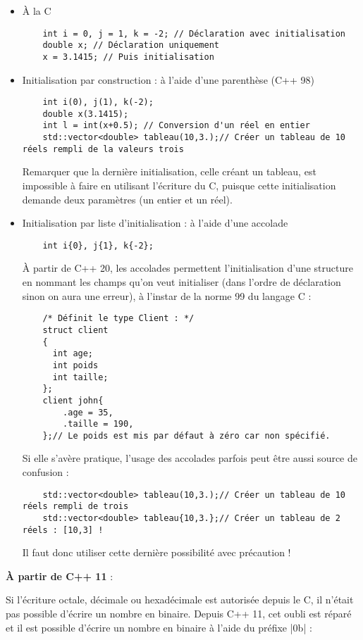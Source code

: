 \begin{itemize}
    \item À la C
    \begin{lstlisting}
    int i = 0, j = 1, k = -2; // Déclaration avec initialisation
    double x; // Déclaration uniquement
    x = 3.1415; // Puis initialisation
    \end{lstlisting}
    \item Initialisation par construction : à l'aide d'une parenthèse (C++ 98)
    \begin{lstlisting}
    int i(0), j(1), k(-2);
    double x(3.1415);
    int l = int(x+0.5); // Conversion d'un réel en entier
    std::vector<double> tableau(10,3.);// Créer un tableau de 10 réels rempli de la valeurs trois
    \end{lstlisting}
    Remarquer que la dernière initialisation, celle créant un tableau, est impossible à
    faire en utilisant l'écriture du C, puisque cette initialisation demande deux paramètres
    (un entier et un réel).
    \item Initialisation par liste d'initialisation : à l'aide d'une accolade
    \begin{lstlisting}
    int i{0}, j{1}, k{-2};
    \end{lstlisting}
    À partir de C++ 20, les accolades permettent l'initialisation d'une structure en nommant les champs qu'on veut initialiser
    (dans l'ordre de déclaration sinon on aura une erreur), à l'instar de la norme 99 du langage C :
    \begin{lstlisting}
    /* Définit le type Client : */
    struct client
    {
      int age;
      int poids
      int taille;
    };
    client john{
        .age = 35,
        .taille = 190,
    };// Le poids est mis par défaut à zéro car non spécifié.
    \end{lstlisting}
    Si elle s'avère pratique, l'usage des accolades parfois peut être aussi source de confusion :
    \begin{lstlisting}
    std::vector<double> tableau(10,3.);// Créer un tableau de 10 réels rempli de trois
    std::vector<double> tableau{10,3.};// Créer un tableau de 2 réels : [10,3] !
    \end{lstlisting}
    Il faut donc utiliser cette dernière possibilité avec précaution !
\end{itemize}

\textbf{À partir de C++ 11} :

Si l'écriture octale, décimale ou hexadécimale est autorisée depuis le C, il n'était pas possible d'écrire un nombre en binaire.
Depuis C++ 11, cet oubli est réparé et il est  possible d'écrire un nombre en binaire à l'aide du préfixe |0b| :

